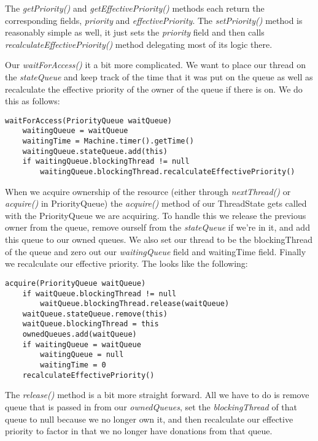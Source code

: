 \documentclass{article}
\begin{document}
The \textit{getPriority()} and \textit{getEffectivePriority()} methods each return the corresponding fields,
\textit{priority} and \textit{effectivePriority}. The \textit{setPriority()} method is reasonably simple as well,
it just sets the \textit{priority} field and then calls \textit{recalculateEffectivePriority()} method delegating
most of its logic there.

Our \textit{waitForAccess()} it a bit more complicated. We want to place our thread on the \textit{stateQueue}
and keep track of the time that it was put on the queue as well as recalculate the effective priority of the owner
of the queue if there is on. We do this as follows:
\begin{lstlisting}
waitForAccess(PriorityQueue waitQueue)
    waitingQueue = waitQueue
    waitingTime = Machine.timer().getTime()
    waitingQueue.stateQueue.add(this)
    if waitingQueue.blockingThread != null
        waitingQueue.blockingThread.recalculateEffectivePriority()
\end{lstlisting}

When we acquire ownership of the resource (either through \textit{nextThread()} or \textit{acquire()} in PriorityQueue)
the \textit{acquire()} method of our ThreadState gets called with the PriorityQueue we are acquiring. To handle this
we release the previous owner from the queue, remove ourself from the \textit{stateQueue} if we're in it, and add this
queue to our owned queues. We also set our thread to be the blockingThread of the queue and zero out our
\textit{waitingQueue} field and waitingTime field. Finally we recalculate our effective priority. The looks like the
following:
\begin{lstlisting}
acquire(PriorityQueue waitQueue)
    if waitQueue.blockingThread != null
        waitQueue.blockingThread.release(waitQueue)
    waitQueue.stateQueue.remove(this)
    waitQueue.blockingThread = this
    ownedQueues.add(waitQueue)
    if waitingQueue = waitQueue
        waitingQueue = null
        waitingTime = 0
    recalculateEffectivePriority()
\end{lstlisting}

The \textit{release()} method is a bit more straight forward. All we have to do is remove queue that is passed in
from our \textit{ownedQueues}, set the \textit{blockingThread} of that queue to null because we no longer own it, and
then recalculate our effective priority to factor in that we no longer have donations from that queue.
\end{document}
